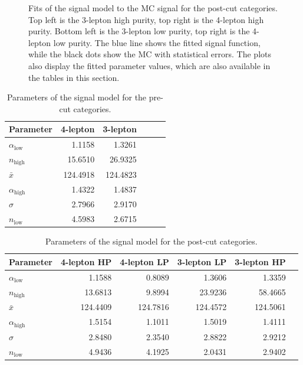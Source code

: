 \begin{figure}[htpb]
  \caption{Fits of the signal model to the MC signal for the post-cut categories. Top left is the 3-lepton high purity, top right is the 4-lepton high purity. Bottom left is the 3-lepton low purity, top right is the 4-lepton low purity. The blue line shows the fitted signal function, while the black dots show the MC with statistical errors. The plots also display the fitted parameter values, which are also available in the tables in this section.}
    \label{fig:hmmSignalFitPostCut}
\end{figure}

\begin{table}[htbp]
 \begin{center}
\begin{tabular}{l r r r r r}\toprule
Parameter & 4-lepton & 3-lepton \\
\midrule
$\alpha_\text{low}$ & 1.1158 & 1.3261 \\
$n_\text{high}$ & 15.6510 & 26.9325 \\
$\bar{x}$ & 124.4918 & 124.4823 \\
$\alpha_\text{high}$ & 1.4322 & 1.4837 \\
$\sigma$ & 2.7966 & 2.9170 \\
$n_\text{low}$ & 4.5983 & 2.6715 \\
\bottomrule\end{tabular}
 \end{center}
 \caption{Parameters of the signal model for the pre-cut categories.}
\label{tab:hmmSignalFitPreCut}
\end{table}

\begin{table}[htbp]
 \begin{center}
\begin{tabular}{l r r r r r}\toprule
Parameter & 4-lepton HP & 4-lepton LP & 3-lepton LP & 3-lepton HP \\
\midrule
$\alpha_\text{low}$ & 1.1588 & 0.8089 & 1.3606 & 1.3359 \\
$n_\text{high}$ & 13.6813 & 9.8994 & 23.9236 & 58.4665 \\
$\bar{x}$ & 124.4409 & 124.7816 & 124.4572 & 124.5061 \\
$\alpha_\text{high}$ & 1.5154 & 1.1011 & 1.5019 & 1.4111 \\
$\sigma$ & 2.8480 & 2.3540 & 2.8822 & 2.9212 \\
$n_\text{low}$ & 4.9436 & 4.1925 & 2.0431 & 2.9402 \\
\bottomrule\end{tabular}
 \end{center}
 \caption{Parameters of the signal model for the post-cut categories.}
\label{tab:hmmSignalFitPostCut}
\end{table}

